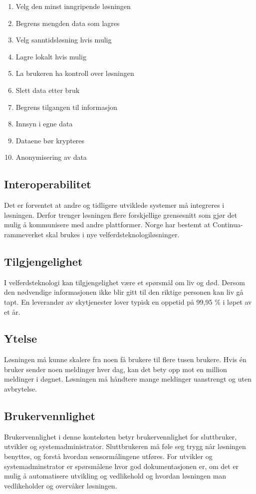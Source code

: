 \begin{enumerate}
    \item Velg den minst inngripende løsningen
    \item Begrens mengden data som lagres
    \item Velg sanntidsløsning hvis mulig
    \item Lagre lokalt hvis mulig
    \item La brukeren ha kontroll over løsningen
    \item Slett data etter bruk
    \item Begrens tilgangen til informasjon
    \item Innsyn i egne data
    \item Dataene bør krypteres
    \item Anonymisering av data
\end{enumerate}

\subsection{Interoperabilitet}
Det er forventet at andre og tidligere utviklede systemer må integreres i løsningen. Derfor trenger løsningen flere forskjellige
grensesnitt som gjør det mulig å kommunisere med andre plattformer. Norge har bestemt at Continua-rammeverket skal brukes i nye
velferdsteknologiløsninger.

\subsection{Tilgjengelighet}
I velferdsteknologi kan tilgjengelighet være et spørsmål om liv og død. Dersom den nødvendige informasjonen ikke blir gitt til den
riktige personen kan liv gå tapt. En leverandør av skytjenester lover typisk en oppetid på 99,95 \% i løpet av et år.

\subsection{Ytelse}
Løsningen må kunne skalere fra noen få brukere til flere tusen brukere. Hvis én bruker sender noen meldinger hver dag, kan det
bety opp mot en million meldinger i døgnet. Løsningen må håndtere mange meldinger uanstrengt og uten avbrytelse.

\subsection{Brukervennlighet}
Brukervennlighet i denne konteksten betyr brukervennlighet for sluttbruker, utvikler og systemadministrator.
Sluttbrukeren må føle seg trygg når løsningen benyttes, og forstå hvordan sensormålingene utføres.
For utvikler og systemadminstrator er spørsmålene hvor god dokumentasjonen er, om det er mulig å automatisere
utvikling og vedlikehold og hvordan løsningen man vedlikeholder og overvåker løsningen.

